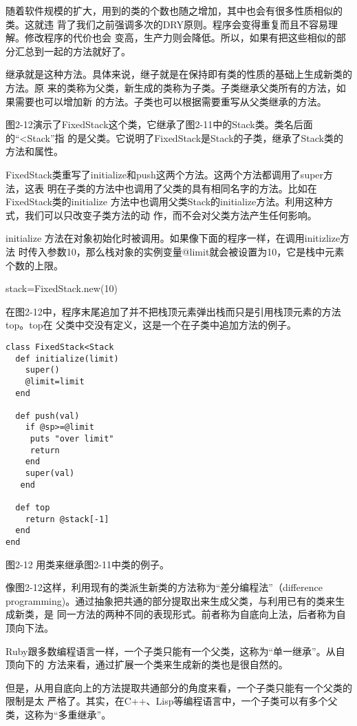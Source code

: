 \documentclass[11pt]{ctexart}
\begin{document}
随着软件规模的扩大，用到的类的个数也随之增加，其中也会有很多性质相似的类。这就违
背了我们之前强调多次的DRY原则。程序会变得重复而且不容易理解。修改程序的代价也会
变高，生产力则会降低。所以，如果有把这些相似的部分汇总到一起的方法就好了。

继承就是这种方法。具体来说，继子就是在保持即有类的性质的基础上生成新类的方法。原
来的类称为父类，新生成的类称为子类。子类继承父类所有的方法，如果需要也可以增加新
的方法。子类也可以根据需要重写从父类继承的方法。

图2-12演示了FixedStack这个类，它继承了图2-11中的Stack类。类名后面的“<Stack”指
的是父类。它说明了FixedStack是Stack的子类，继承了Stack类的方法和属性。

FixedStack类重写了initialize和push这两个方法。这两个方法都调用了super方法，这表
明在子类的方法中也调用了父类的具有相同名字的方法。比如在FixedStack类的initialize
方法中也调用父类Stack的initialize方法。利用这种方式，我们可以只改变子类方法的动
作，而不会对父类方法产生任何影响。

initialize 方法在对象初始化时被调用。如果像下面的程序一样，在调用initizlize方法
时传入参数10，那么栈对象的实例变量@limit就会被设置为10，它是栈中元素个数的上限。

stack=FixedStack.new(10)

在图2-12中，程序末尾追加了并不把栈顶元素弹出栈而只是引用栈顶元素的方法top。top在
父类中交没有定义，这是一个在子类中追加方法的例子。

\lstset{language=org,label= ,caption= ,captionpos=b,numbers=none}
\begin{lstlisting}
class FixedStack<Stack
  def initialize(limit)
    super()
    @limit=limit
  end

  def push(val)
    if @sp>=@limit
     puts "over limit"
     return
    end
    super(val)
   end

  def top 
    return @stack[-1]
  end
end
\end{lstlisting}
图2-12 用类来继承图2-11中类的例子。


像图2-12这样，利用现有的类派生新类的方法称为“差分编程法”（difference
programming)。通过抽象把共通的部分提取出来生成父类，与利用已有的类来生成新类，是
同一方法的两种不同的表现形式。前者称为自底向上法，后者称为自顶向下法。

Ruby跟多数编程语言一样，一个子类只能有一个父类，这称为“单一继承”。从自顶向下的
方法来看，通过扩展一个类来生成新的类也是很自然的。

但是，从用自底向上的方法提取共通部分的角度来看，一个子类只能有一个父类的限制是太
严格了。其实，在C++、Lisp等编程语言中，一个子类可以有多个父类，这称为“多重继承”。
\end{document}
